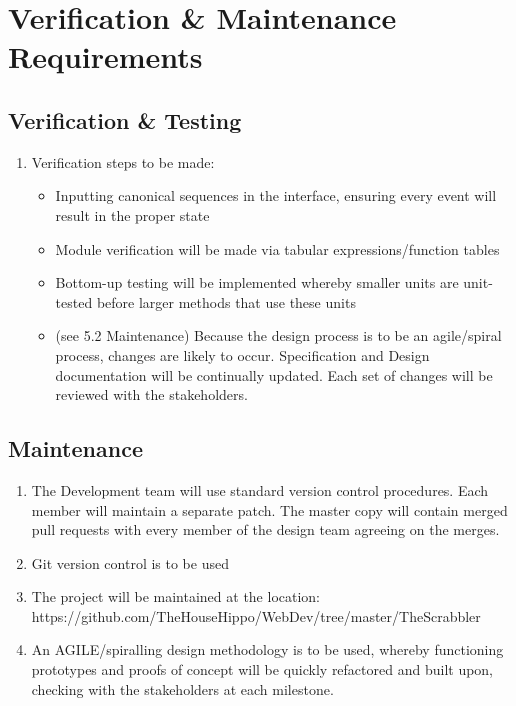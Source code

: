 \documentclass[12pt, oneside]{article}
\begin{document}
\section{Verification \& Maintenance Requirements}
\subsection{Verification \& Testing}
\begin{enumerate}
	\item Verification steps to be made:
	\begin{itemize}
		\item Inputting canonical sequences in the interface, ensuring every event will result in the 			proper state
		\item Module verification will be made via tabular expressions/function tables
		\item Bottom-up testing will be implemented whereby smaller units are unit-tested before 
			larger methods that use these units
		\item (see 5.2 Maintenance) Because the design process is to be an agile/spiral process, 				changes are likely to occur.  Specification and Design documentation will be continually 			updated.  Each set of changes will be reviewed with the stakeholders.
	\end{itemize}
\end{enumerate}

\subsection{Maintenance}
\begin{enumerate}
	\item The Development team will use standard version control procedures.  Each member will 			maintain a separate patch.  The master copy will contain merged pull requests with every 			member of the design team agreeing on the merges.
	\item Git version control is to be used
	\item The project will be maintained at the location: \\
	https://github.com/TheHouseHippo/WebDev/tree/master/TheScrabbler
	\item An AGILE/spiralling design methodology is to be used, whereby functioning prototypes
		and proofs of concept will be quickly refactored and built upon, checking with the 				stakeholders at each milestone.
\end{enumerate}
\end{document}

